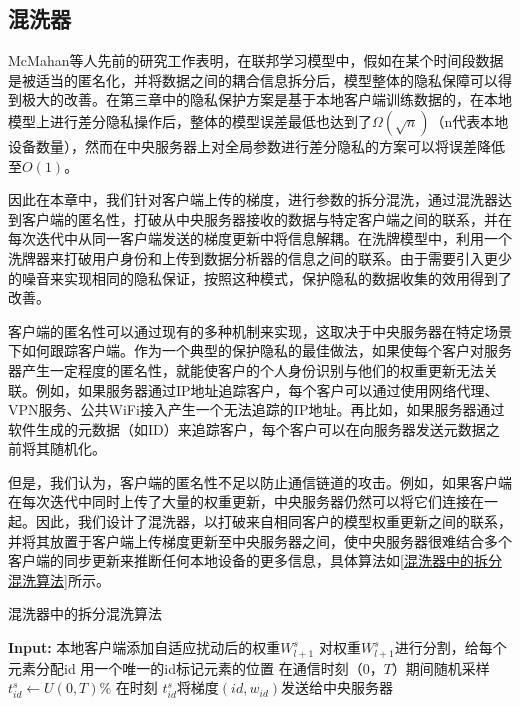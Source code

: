 \subsection{混洗器}
McMahan等人先前的研究工作表明，在联邦学习模型中，假如在某个时间段数据是被适当的匿名化，并将数据之间的耦合信息拆分后，模型整体的隐私保障可以得到极{}大的改善。在第三章中的隐私保护方案是基于本地客户端训练数据的，在本地模型上进行差分隐私操作后，整体的模型误差最低也达到了$\Omega(\sqrt{n})$（n代表本地设备数量），然而在中央服务器上对全局参数进行差分隐私的方案可以将误差降低至$O(1)$。

因此在本章中，我们针对客户端上传的梯度，进行参数的拆分混洗，通过混洗器达到客户端的匿名性，打破从中央服务器接收的数据与特定客户端之间的联系，并在每次迭代中从同一客户端发送的梯度更新中将信息解耦。在洗牌模型中，利用一个洗牌器来打破用户身份和上传到数据分析器的信息之间的联系。由于需要引入更少的噪音来实现相同的隐私保证，按照这种模式，保护隐私的数据收集的效用得到了改善。

客户端的匿名性可以通过现有的多种机制来实现，这取决于中央服务器在特定场景下如何跟踪客户端。作为一个典型的保护隐私的最佳做法，如果使每个客户对服务器产生一定程度的匿名性，就能使客户的个人身份识别与他们的权重更新无法关联。例如，如果服务器通过IP地址追踪客户，每个客户可以通过使用网络代理、VPN服务、公共WiFi接入产生一个无法追踪的IP地址。再比如，如果服务器通过软件生成的元数据（如ID）来追踪客户，每个客户可以在向服务器发送元数据之前将其随机化。

但是，我们认为，客户端的匿名性不足以防止通信链道的攻击。例如，如果客户端在每次迭代中同时上传了大量的权重更新，中央服务器仍然可以将它们连接在一起。因此，我们设计了混洗器，以打破来自相同客户的模型权重更新之间的联系，并将其放置于客户端上传梯度更新至中央服务器之间，使中央服务器很难结合多个客户端的同步更新来推断任何本地设备的更多信息，具体算法如\ref{混洗器中的拆分混洗算法}所示。

\begin{algorithm}[!htb]
	\caption{混洗器中的拆分混洗算法}
	\label{混洗器中的拆分混洗算法}
	\begin{algorithmic}[1]
		\footnotesize
		\STATE \textbf{Input:} 本地客户端添加自适应扰动后的权重$W_{l+1}^{s}$
	    \STATE 对权重$W_{l+1}^{s}$进行分割，给每个元素分配id
	    \STATE 用一个唯一的id标记元素的位置
	    \STATE 在通信时刻（0，$T$）期间随机采样$t_{i d}^{s} \leftarrow U(0, T) \%$
	    \ENDFOR
	    \STATE 在时刻 $t_{i d}^{s}$将梯度$(i d, w_{i d})$发送给中央服务器
	\end{algorithmic}
\end{algorithm}

